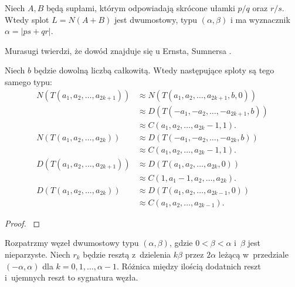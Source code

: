 \begin{proposition}
    Niech $A, B$ będą supłami, którym odpowiadają skrócone ułamki $p/q$ oraz $r/s$.
    Wtedy splot $L = N(A+B)$ jest dwumostowy, typu $(\alpha, \beta)$ i ma wyznacznik $\alpha = |ps + qr|$.
\end{proposition}

Murasugi \cite[twierdzenie 9.3.5]{murasugi1996} twierdzi, że dowód znajduje się u Ernsta, Sumnersa \cite[lemat 2.1]{ernst1990}.
%
%

\begin{proposition}
    Niech $b$ będzie dowolną liczbą całkowitą.
    Wtedy następujące sploty są tego samego typu:
    \begin{align}
        N(T(a_1, a_2, \ldots, a_{2k+1})) & \approx N(T(a_1, a_2, \ldots, a_{2k+1}, b, 0)) \\
                                         & \approx D(T(-a_1, -a_2, \ldots, -a_{2k+1}, b)) \\
                                         & \approx C(a_1, a_2, \ldots, a_{2k}-1, 1). \\
        N(T(a_1, a_2, \ldots, a_{2k}))   & \approx D(T(-a_1, -a_2, \ldots, -a_{2k}, b)) \\
                                         & \approx C(a_1, a_2, \ldots, a_{2k}-1, 1). \\
        D(T(a_1, a_2, \ldots, a_{2k+1})) & \approx D(T(a_1, a_2, \ldots, a_{2k}, 0)) \\
                                         & \approx C(1, a_1-1, a_2, \ldots, a_{2k}). \\
        D(T(a_1, a_2, \ldots, a_{2k}))   & \approx D(T(a_1, a_2, \ldots, a_{2k-1}, 0)) \\
                                         & \approx C(a_1, a_2, \ldots, a_{2k-1}).
    \end{align}
\end{proposition}

\begin{proof}
    \cite[fakt 9.3.4]{murasugi1996}
\end{proof}

\begin{proposition}
    Rozpatrzmy węzeł dwumostowy typu $(\alpha, \beta)$, gdzie $0 < \beta < \alpha$ i~$\beta$ jest nieparzyste.
    Niech $r_k$ będzie resztą z~dzielenia $k\beta$ przez $2\alpha$ leżącą w~przedziale $(-\alpha, \alpha)$ dla $k = 0, 1, \ldots, \alpha - 1$.
    Różnica między ilością dodatnich reszt i~ujemnych reszt to sygnatura węzła.
\end{proposition}

